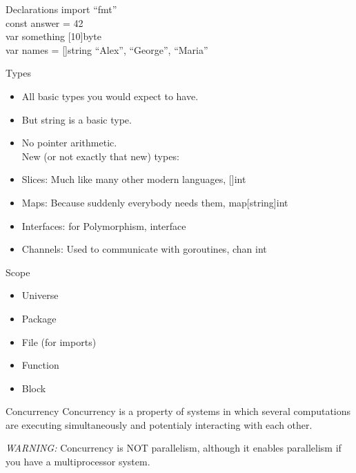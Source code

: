 \documentclass{beamer}
\begin{document}
    \begin{frame}{Declarations}
        import ``fmt''\\
        const answer = 42\\
        var something [10]byte\\
        var names = []string \textbraceleft ``Alex'', ``George'', ``Maria'' \textbraceright \\
    \end{frame}

    \begin{frame}{Types}
        \begin{itemize}
            \item All basic types you would expect to have.\\
            \item But string is a basic type.\\
            \item No pointer arithmetic.\\
            New (or not exactly that new) types:\\
            \item Slices: Much like many other modern languages, []int \\
            \item Maps: Because suddenly everybody needs them, map[string]int \\
            \item Interfaces: for Polymorphism, interface\textbraceleft \textbraceright \\
            \item Channels: Used to communicate with goroutines, chan int
        \end{itemize}
    \end{frame}

    \begin{frame}{Scope}
        \begin{itemize}
            \item Universe
            \item Package
            \item File (for imports)
            \item Function
            \item Block
        \end{itemize}
    \end{frame}

    \begin{frame}{Concurrency}
       Concurrency is a property of systems in which several computations are
       executing simultaneously and potentialy interacting with each other.
       
       \emph{ {\color{red}WARNING:}} Concurrency is {\color{red}NOT} parallelism,
       although it enables parallelism if you have a multiprocessor system.
    \end{frame}
\end{document}
